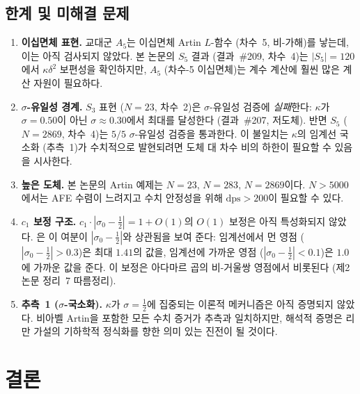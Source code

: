 \documentclass[11pt, a4paper]{article}
\theoremstyle{plain}
\theoremstyle{definition}
\newcommand{\abs}[1]{\left|#1\right|}
\newcommand{\kap}{\kappa}             %
\begin{document}
\subsection{한계 및 미해결 문제}
\label{sec:limitations}

\begin{enumerate}
  \item \textbf{이십면체 표현.}
    교대군 $A_{5}$는 이십면체 Artin $L$-함수 (차수~5, 비-가해)를 낳는데,
    이는 아직 검사되지 않았다.
    본 논문의 $S_{5}$ 결과 (결과~\#209, 차수~4)는 $|S_{5}|=120$에서
    $\kap\delta^{2}$ 보편성을 확인하지만, $A_{5}$ (차수-5 이십면체)는
    계수 계산에 훨씬 많은 계산 자원이 필요하다.
  \item \textbf{$\sigma$-유일성 경계.}
    $S_{3}$ 표현 ($N=23$, 차수~2)은 $\sigma$-유일성 검증에 \emph{실패}한다:
    $\kap$가 $\sigma=0.50$이 아닌 $\sigma\approx0.30$에서 최대를 달성한다
    (결과~\#207, 저도체).  반면 $S_{5}$ ($N=2869$, 차수~4)는
    $5/5$ $\sigma$-유일성 검증을 통과한다.
    이 불일치는 $\kap$의 임계선 국소화 (추측~1)가 수치적으로
    발현되려면 도체 대 차수 비의 하한이 필요할 수 있음을 시사한다.
  \item \textbf{높은 도체.}
    본 논문의 Artin 예제는 $N=23$, $N=283$, $N=2869$이다.
    $N > 5000$에서는 AFE 수렴이 느려지고 수치 안정성을 위해
    $\text{dps} > 200$이 필요할 수 있다.
  \item \textbf{$c_{1}$ 보정 구조.}
    $c_{1}\cdot\abs{\sigma_{0}-\tfrac{1}{2}} = 1 + O(1)$의 $O(1)$ 보정은
    아직 특성화되지 않았다. 은 이 여분이
    $\abs{\sigma_{0}-\tfrac{1}{2}}$와 상관됨을 보여 준다:
    임계선에서 먼 영점 ($\abs{\sigma_{0}-\tfrac{1}{2}} > 0.3$)은
    최대 $1.41$의 값을, 임계선에 가까운 영점
    ($\abs{\sigma_{0}-\tfrac{1}{2}} < 0.1$)은 $1.0$에 가까운 값을 준다.
    이 보정은 아다마르 곱의 비-거울쌍 영점에서 비롯된다
    (제2논문 정리~7 따름정리).
  \item \textbf{추측~1 ($\sigma$-국소화).}
    $\kap$가 $\sigma = \tfrac{1}{2}$에 집중되는 이론적 메커니즘은
    아직 증명되지 않았다. 비아벨 Artin을 포함한 모든 수치 증거가
    추측과 일치하지만, 해석적 증명은 리만 가설의 기하학적 정식화를 향한
    의미 있는 진전이 될 것이다.
\end{enumerate}


\section{결론}
\label{sec:conclusion}
\end{document}
